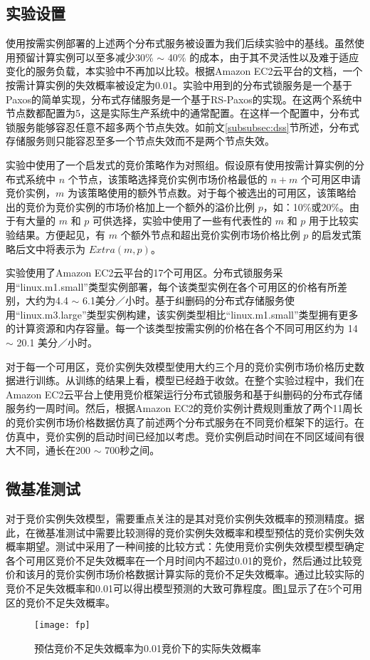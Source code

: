 \subsection{实验设置}
使用按需实例部署的上述两个分布式服务被设置为我们后续实验中的基线。虽然使用预留计算实例可以至多减少30\% $\sim$ 40\% 的成本，由于其不灵活性以及难于适应变化的服务负载，本实验中不再加以比较。根据Amazon EC2云平台的文档\cite{AWS_SLA:2014}，一个按需计算实例的失效概率被设定为0.01。实验中用到的分布式锁服务是一个基于Paxos的简单实现，分布式存储服务是一个基于RS-Paxos的实现\cite{Mu:2014:PME:2600212.2600218}。在这两个系统中节点数都配置为5，这是实际生产系统中的通常配置\cite{Burrows:2006:CLS:1298455.1298487, Mu:2014:PME:2600212.2600218}。在这样一个配置中，分布式锁服务能够容忍任意不超多两个节点失效。如前文\ref{subsubsec:dss}节所述，分布式存储服务则只能容忍至多一个节点失效而不是两个节点失效。

实验中使用了一个启发式的竞价策略作为对照组。假设原有使用按需计算实例的分布式系统中 $n$ 个节点，该策略选择竞价实例市场价格最低的 $n + m$ 个可用区申请竞价实例，$m$ 为该策略使用的额外节点数。对于每个被选出的可用区，该策略给出的竞价为竞价实例的市场价格加上一个额外的溢价比例 $p$，如：10\%或20\%。由于有大量的 $m$ 和 $p$ 可供选择，实验中使用了一些有代表性的 $m$ 和 $p$ 用于比较实验结果。方便起见，有 $m$ 个额外节点和超出竞价实例市场价格比例 $p$ 的启发式策略后文中将表示为 $Extra(m, p)$。

实验使用了Amazon EC2云平台的17个可用区。分布式锁服务采用``linux.m1.small''类型实例部署，每个该类型实例在各个可用区的价格有所差别，大约为4.4 $\sim$ 6.1美分／小时。基于纠删码的分布式存储服务使用``linux.m3.large''类型实例构建，该实例类型相比``linux.m1.small''类型拥有更多的计算资源和内存容量。每一个该类型按需实例的价格在各个不同可用区约为 14 $\sim$ 20.1 美分／小时。

对于每一个可用区，竞价实例失效模型使用大约三个月的竞价实例市场价格历史数据进行训练。从训练的结果上看，模型已经趋于收敛。在整个实验过程中，我们在Amazon EC2云平台上使用竞价框架运行分布式锁服务和基于纠删码的分布式存储服务约一周时间。然后，根据Amazon EC2的竞价实例计费规则重放了两个11周长的竞价实例市场价格数据仿真了前述两个分布式服务在不同竞价框架下的运行。在仿真中，竞价实例的启动时间已经加以考虑。竞价实例启动时间在不同区域间有很大不同，通长在200 $\sim$ 700秒之间\cite{Mao:2012:PSV:2353730.2353859}。

\subsection{微基准测试}
对于竞价实例失效模型，需要重点关注的是其对竞价实例失效概率的预测精度。据此，在微基准测试中需要比较测得的竞价实例失效概率和模型预估的竞价实例失效概率期望。测试中采用了一种间接的比较方式：先使用竞价实例失效模型模型确定各个可用区竞价不足失效概率在一个月时间内不超过0.01的竞价，然后通过比较竞价和该月的竞价实例市场价格数据计算实际的竞价不足失效概率。通过比较实际的竞价不足失效概率和0.01可以得出模型预测的大致可靠程度。图\ref{figure:fp}显示了在5个可用区的竞价不足失效概率。
\begin{figure}
  \centering
  \texttt{[image: fp]}
  \caption{预估竞价不足失效概率为0.01竞价下的实际失效概率}
  \label{figure:fp}
\end{figure}

